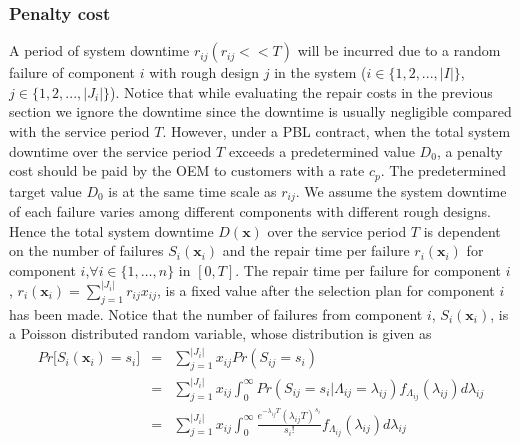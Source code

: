 \documentclass[preprint,12pt]{elsarticle}
\begin{document}
\subsubsection{Penalty cost}
A period of system downtime $r_{ij}(r_{ij}<<T)$ will be incurred due to a random failure of component $i$ with rough design $j$ in the system ($i \in \{1,2,...,\rvert I \lvert \}$, $j \in \{1,2,...,\rvert J_{i} \lvert \}$). Notice that while evaluating the repair costs in the previous section we ignore the downtime since the downtime is usually negligible compared with the service period $T$. However, under a PBL contract, when the total system downtime over the service period $T$ exceeds a predetermined value $D_0$, a penalty cost should be paid by the OEM to customers with a rate $c_p$. The predetermined target value $D_0$ is at the same time scale as $r_{ij}$. We assume the system downtime of each failure varies among different components with different rough designs. Hence the total system downtime $D{(\boldsymbol{x})}$ over the service period $T$ is dependent on the number of failures $S_{i}(\boldsymbol{x}_{i})$ and the repair time per failure $r_{i}(\boldsymbol{x}_{i})$ for component $i$,$\forall i\in \{1,\dots,n\}$ in $[0,T]$. The repair time per failure for component $i$, $r_{i}(\boldsymbol{x}_{i})=\sum_{j=1}^{\rvert J_{i} \lvert}{r_{ij}x_{ij}}$, is a fixed value after the selection plan for component $i$ has been made. Notice that the number of failures from component $i$, $S_{i}(\boldsymbol{x}_{i})$, is a Poisson distributed random variable, whose distribution is given as
\begin{eqnarray}
Pr\bigg[S_{i}(\boldsymbol{x}_{i})=s_{i}\bigg] &=&\sum^{\rvert J_{i} \lvert}_{j=1}{x_{ij}Pr(S_{ij}=s_{i})} \nonumber\\
&=&\sum^{\rvert J_{i} \lvert}_{j=1}{x_{ij}\int^{\infty}_{0}Pr(S_{ij}=s_{i}|\Lambda_{ij}=\lambda_{ij})f_{\Lambda_{ij}}(\lambda_{ij})d\lambda_{ij}} \nonumber\\
&=&\sum^{\rvert J_{i} \lvert}_{j=1}{x_{ij}\int^{\infty}_{0}{\frac{e^{-\lambda_{ij}T}(\lambda_{ij}T)^{s_{i}}}{s_{i}!}f_{\Lambda_{ij}}(\lambda_{ij})}d\lambda_{ij}}
\end{eqnarray}
\end{document}
